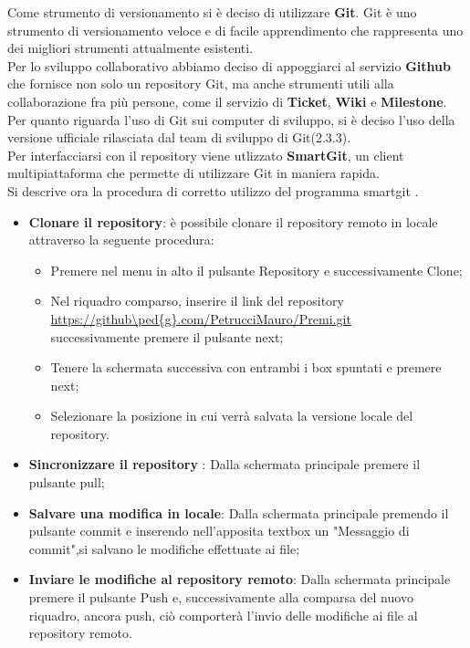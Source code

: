 Come strumento di versionamento si è deciso di utilizzare \textbf{Git}.
Git è uno strumento di versionamento veloce e di facile apprendimento che
rappresenta uno dei migliori strumenti attualmente esistenti.\\ Per lo sviluppo collaborativo abbiamo deciso di appoggiarci al servizio \textbf{Github} che fornisce non solo un repository Git, ma anche strumenti utili alla collaborazione fra più persone, come il servizio di \textbf{Ticket}, \textbf{Wiki} e \textbf{Milestone}.\\
Per quanto riguarda l’uso di Git sui computer di sviluppo, si è deciso l’uso
della versione ufficiale rilasciata dal team di sviluppo di Git(2.3.3).\\
Per interfacciarsi con il repository viene utlizzato \textbf{SmartGit}, un client multipiattaforma che permette di utilizzare Git in maniera rapida.\\
Si descrive ora la procedura di corretto utilizzo del programma smartgit .
\begin{itemize}

\item 	\textbf{Clonare il repository}: è possibile clonare il repository remoto in locale attraverso la seguente procedura:

\begin{itemize}
\item Premere nel menu in alto il pulsante Repository e successivamente Clone;
\item Nel riquadro comparso, inserire il link del repository\\ \url{https://github\ped{g}.com/PetrucciMauro/Premi.git}\\successivamente premere il pulsante  next;
\item Tenere la schermata successiva con entrambi i box spuntati e premere next;
\item Selezionare la posizione in cui verrà salvata la versione locale del repository.
\end{itemize}
\item \textbf{Sincronizzare il repository} : Dalla schermata principale premere il pulsante pull; 
\item \textbf{Salvare una modifica in locale}: Dalla schermata principale premendo il pulsante commit e inserendo nell'apposita textbox un "Messaggio di commit",si salvano le modifiche effettuate ai file;
\item \textbf{Inviare le modifiche al repository remoto}: Dalla schermata principale premere il pulsante Push e, successivamente alla comparsa del nuovo riquadro, ancora push, ciò comporterà l'invio delle modifiche ai file al repository remoto.

\end{itemize}

